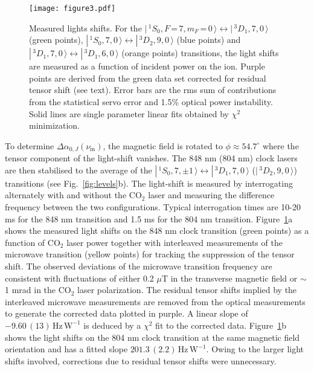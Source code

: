 \documentclass[pra,aps,showpacs,floatfix,twocolumn,nofootinbib,citeautoscript]{revtex4-1}
\def\ket#1{|\,#1 \,\rangle}
\newcommand{\fref}[1]{Fig.~\ref{#1}}
\begin{document}
\begin{figure}
\texttt{[image: figure3.pdf]}
\caption{Measured lights shifts. For the $\ket{^1S_0,F\,$=$\,7,m_F\,$=$\,0} \leftrightarrow \ket{^3D_1,7,0}$ (green points),  $\ket{^1S_0,7,0} \leftrightarrow \ket{^3D_2,9,0}$ (blue points) and $\ket{^3D_1,7,0} \leftrightarrow \ket{^3D_1,6,0}$ (orange points) transitions, the light shifts are measured as a function of incident power on the ion. Purple points are derived from the green data set corrected for residual tensor shift (see text). Error bars are the rms sum of contributions from the statistical servo error and 1.5\% optical power instability. Solid lines are single parameter linear fits obtained by $\chi^2$ minimization. }
\label{fig:result}
\end{figure}

 To determine $\Delta \alpha_{0,J}(\nu_\mathrm{m})$, the magnetic field is rotated to $\phi \approx 54.7^\circ$ where the tensor component of the light-shift vanishes.  The 848 nm (804 nm) clock lasers are then stabilised to the average of the $\ket{^1S_0,7,\pm1} \leftrightarrow \ket{^3D_1,7,0}$ ($\ket{^3D_2,9,0}$) transitions (see \fref{fig:levels}b). The light-shift is measured by interrogating alternately with and without the CO$_2$ laser and measuring the difference frequency between the two configurations. Typical interrogation times are 10-20 ms for the 848 nm transition and 1.5 ms for the 804 nm transition. Figure~\ref{fig:result}a shows the measured light shifts on the  848 nm clock transition (green points) as a function of  CO$_2$ laser power together with interleaved measurements of the microwave transition (yellow points) for tracking the suppression of the tensor shift.  The observed deviations of the microwave transition frequency are consistent with fluctuations of either 0.2 $\mu$T in the transverse magnetic field or $\sim$1 mrad in the CO$_2$ laser polarization.  The residual tensor shifts implied by the interleaved microwave measurements are removed from the optical measurements to generate the corrected data plotted in purple.  A linear slope of $-9.60\,(13)\, \mathrm{Hz}\,\mathrm{W}^{-1}$ is deduced by a $\chi^2$ fit to the corrected data.  Figure~\ref{fig:result}b shows the light shifts on the 804 nm clock transition at the same magnetic field orientation and has a fitted slope $201.3 \,(2.2) \,\mathrm{Hz}\,\mathrm{W}^{-1}$.  Owing to the larger light shifts involved, corrections due to residual tensor shifts were unnecessary.
\end{document}
